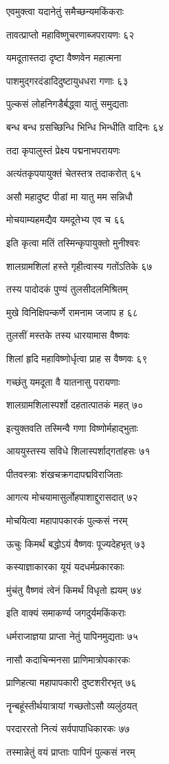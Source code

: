 एवमुक्त्वा यदानेतुं समैच्छन्यमकिंकराः

तावत्प्राप्तो महाविष्णुचरणाब्जपरायणः ६२

यमदूतास्तदा दृष्टा वैष्णवेन महात्मना

पाशमुद्गरदंडादिदुष्टायुधधरा गणाः ६३

पुल्कसं लोहनिगडैर्बद्ध्वा यातुं समुद्यताः

बन्ध बन्ध ग्रसच्छिन्धि भिन्धि भिन्धीति वादिनः ६४

तदा कृपालुस्तं प्रेक्ष्य पद्मनाभपरायणः

अत्यंतकृपयायुक्तं चेतस्तत्र तदाकरोत् ६५

असौ महादुष्ट पीडां मा यातु मम सन्निधौ

मोचयाम्यहमद्यैव यमदूतेभ्य एव च ६६

इति कृत्वा मतिं तस्मिन्कृपायुक्तो मुनीश्वरः

शालग्रामशिलां हस्ते गृहीत्वास्य गतोंऽतिके ६७

तस्य पादोदकं पुण्यं तुलसीदलमिश्रितम्

मुखे विनिक्षिपन्कर्णे रामनाम जजाप ह ६८

तुलसीं मस्तके तस्य धारयामास वैष्णवः

शिलां हृदि महाविष्णोर्धृत्वा प्राह स वैष्णवः ६९

गच्छंतु यमदूता वै यातनासु परायणाः

शालग्रामशिलास्पर्शो दहतात्पातकं महत् ७०

इत्युक्तवति तस्मिन्वै गणा विष्णोर्महाद्भुताः

आययुस्तस्य सविधे शिलास्पर्शाद्गतांहसः ७१

पीतवस्त्राः शंखचक्रगदापद्मविराजिताः

आगत्य मोचयामासुर्लोहपाशाद्दुरासदात् ७२

मोचयित्वा महापापकारकं पुल्कसं नरम्

ऊचुः किमर्थं बद्धोऽयं वैष्णवः पूज्यदेहभृत् ७३

कस्याज्ञाकारका यूयं यदधर्मप्रकारकाः

मुंचंतु वैष्णवं त्वेनं किमर्थं विधृतो ह्ययम् ७४

इति वाक्यं समाकर्ण्य जगदुर्यमकिंकराः

धर्मराजाज्ञया प्राप्ता नेतुं पापिनमुद्यताः ७५

नासौ कदाचिन्मनसा प्राणिमात्रोपकारकः

प्राणिहत्या महापापकारी दुष्टशरीरभृत् ७६

नॄन्बहूंस्तीर्थयात्रायां गच्छतोऽसौ व्यलुंठयत्

परदाररतो नित्यं सर्वपापाधिकारकः ७७

तस्मान्नेतुं वयं प्राप्ताः पापिनं पुल्कसं नरम्

